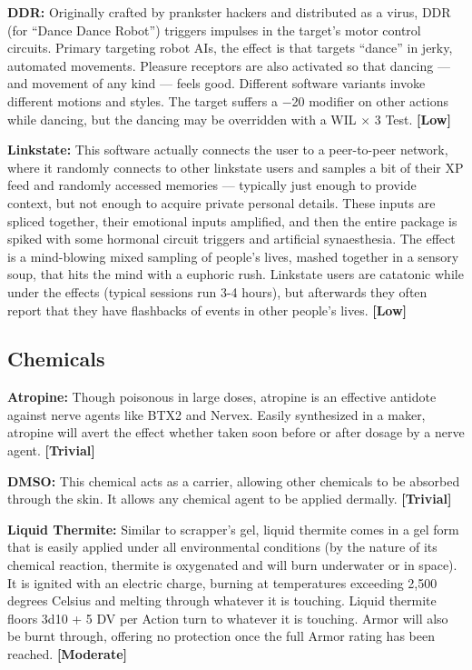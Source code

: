\textbf{DDR:} Originally crafted by prankster hackers and distributed as a virus, DDR (for ``Dance Dance Robot'') triggers impulses in the target’s motor control circuits. Primary targeting robot AIs, the effect is that targets ``dance'' in jerky, automated movements. Pleasure receptors are also activated so that dancing --- and movement of any kind --- feels good. Different software variants invoke different motions and styles. The target suffers a $-$20 modifier on other actions while dancing, but the dancing may be overridden with a WIL $\times$ 3 Test. \textbf{[Low]} 

\textbf{Linkstate:} This software actually connects the user to a peer-to-peer network, where it randomly connects to other linkstate users and samples a bit of their XP feed and randomly accessed memories --- typically just enough to provide context, but not enough to acquire private personal details. These inputs are spliced together, their emotional inputs amplified, and then the entire package is spiked with some hormonal circuit triggers and artificial synaesthesia. The effect is a mind-blowing mixed sampling of people’s lives, mashed together in a sensory soup, that hits the mind with a euphoric rush. Linkstate users are catatonic while under the effects (typical sessions run 3-4 hours), but afterwards they often report that they have flashbacks of events in other people’s lives. \textbf{[Low]} 



\subsection{Chemicals} \label{sec:chemicals} 

\textbf{Atropine:} Though poisonous in large doses, atropine is an effective antidote against nerve agents like BTX2 and Nervex. Easily synthesized in a maker, atropine will avert the effect whether taken soon before or after dosage by a nerve agent. \textbf{[Trivial]} 

\textbf{DMSO:} This chemical acts as a carrier, allowing other chemicals to be absorbed through the skin. It allows any chemical agent to be applied dermally. \textbf{[Trivial]} 

\textbf{Liquid Thermite:} Similar to scrapper’s gel, liquid thermite comes in a gel form that is easily applied under all environmental conditions (by the nature of its chemical reaction, thermite is oxygenated and will burn underwater or in space). It is ignited with an electric charge, burning at temperatures exceeding 2,500 degrees Celsius and melting through whatever it is touching. Liquid thermite floors 3d10 + 5 DV per Action turn to whatever it is touching. Armor will also be burnt through, offering no protection once the full Armor rating has been reached. \textbf{[Moderate]} 

